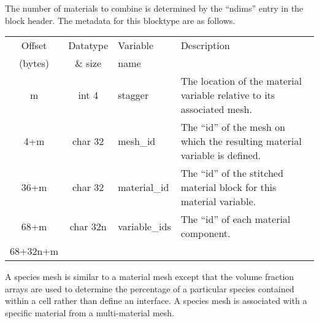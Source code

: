 \documentclass[12pt]{article}
\begin{document}
The number of materials to combine is determined by the ``ndims'' entry in
the block header. The metadata for this blocktype are as follows.\\

\begin{center}
\begin{tabularx}{0.9\textwidth}[!hbt]{cclX}
  Offset & Datatype & Variable & Description\\
  (bytes) & \& size & name &
  \\\toprule

  m & int 4 & stagger & The location of the material variable relative to its
  associated mesh.
  \\\midrule

  4+m & char 32 & mesh\_id & The ``id'' of the mesh on which the resulting
  material variable is defined.
  \\\midrule

  36+m & char 32 & material\_id & The ``id'' of the stitched material block
  for this material variable.
  \\\midrule

  68+m & char 32n & variable\_ids & The ``id'' of each material component.
  \\\midrule

  68+32n+m &
\end{tabularx}
\end{center}\vspace{10pt}

A species mesh is similar to a material mesh except that the volume fraction
arrays are used to determine the percentage of a particular species contained
within a cell rather than define an interface. A species mesh is associated
with a specific material from a multi-material mesh.\\
\end{document}
